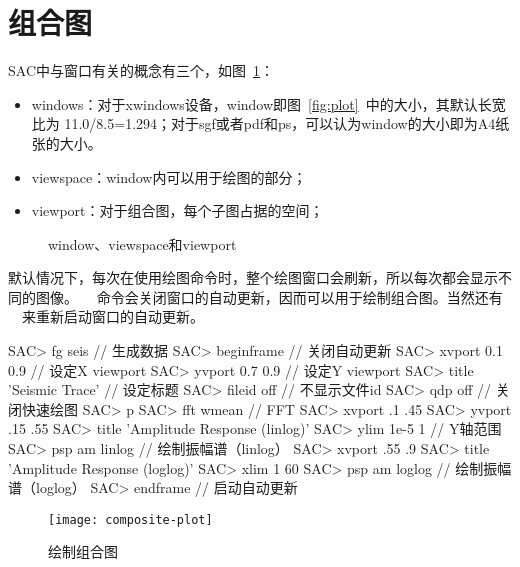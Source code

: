 \section{组合图}
\label{sec:composite-plots}

SAC中与窗口有关的概念有三个，如图~\ref{fig:window-viewspace-viewport}：
\begin{itemize}
\item windows：对于xwindows设备，window即图~\ref{fig:plot}~中的大小，其默认长宽比为
    11.0/8.5=1.294；对于sgf或者pdf和ps，可以认为window的大小即为A4纸张的大小。
\item viewspace：window内可以用于绘图的部分；
\item viewport：对于组合图，每个子图占据的空间；
\end{itemize}

\begin{figure}[H]
\centering
{}
\caption{window、viewspace和viewport}
\label{fig:window-viewspace-viewport}
\end{figure}

默认情况下，每次在使用绘图命令时，整个绘图窗口会刷新，所以每次都会显示不同的图像。
~~命令会关闭窗口的自动更新，因而可以用于绘制组合图。当然还有
~~来重新启动窗口的自动更新。

\begin{SACCode}
SAC> fg seis                        // 生成数据
SAC> beginframe                     // 关闭自动更新
SAC> xvport 0.1 0.9                 // 设定X viewport
SAC> yvport 0.7 0.9                 // 设定Y viewport
SAC> title 'Seismic Trace'          // 设定标题
SAC> fileid off                     // 不显示文件id
SAC> qdp off                        // 关闭快速绘图
SAC> p                              
SAC> fft wmean                      // FFT
SAC> xvport .1 .45                  
SAC> yvport .15 .55
SAC> title 'Amplitude Response (linlog)'
SAC> ylim 1e-5 1                    // Y轴范围
SAC> psp am linlog                  // 绘制振幅谱（linlog）
SAC> xvport .55 .9                  
SAC> title 'Amplitude Response (loglog)'
SAC> xlim 1 60
SAC> psp am loglog                  // 绘制振幅谱（loglog）
SAC> endframe                       // 启动自动更新
\end{SACCode}

\begin{figure}[H]
\centering
\texttt{[image: composite-plot]}
\caption{绘制组合图}
\label{fig:composite-plot}
\end{figure}
